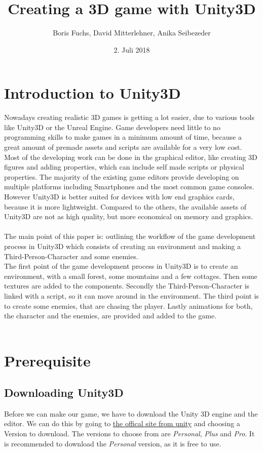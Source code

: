 \documentclass[12pt, a4paper, titlepage]{article}
\title{Creating a 3D game with Unity3D}
\date{2. Juli 2018}
\author{Boris Fuchs, David Mitterlehner, Anika Seibezeder}
\begin{document}
\maketitle
\tableofcontents 

\section{Introduction to Unity3D}
Nowadays creating realistic 3D games is getting a lot easier, due to various tools like Unity3D or the Unreal Engine. Game developers need little to no programming skills to make games in a minimum amount of time, because a great amount of premade assets and scripts are available for a very low cost. Most of the developing work can be done in the graphical editor, like creating 3D figures and adding properties, which can include self made scripts or physical properties. The majority of the existing game editors provide developing on multiple platforms including Smartphones and the most common game consoles. However Unity3D is better suited for devices with low end graphics cards, because it is more lightweight. Compared to the others, the available assets of Unity3D are not as high quality, but more economical on memory and graphics. \\ \\
The main point of this paper is: outlining the workflow of the game development process in Unity3D which consists of creating an environment and making a Third-Person-Character and some enemies.  \\
The first point of the game development process in Unity3D is to create an environment, with a small forest, some mountains and a few cottages. Then some textures are added to the components.
Secondly the Third-Person-Character is linked with a  script, so it can move around in the environment.
The third point is to create some enemies, that are chasing the player. 
Lastly animations for both, the character and the enemies, are provided and added to the game. \\ \\

\section{Prerequisite}
\subsection{Downloading Unity3D}
Before we can make our game, we have to download the Unity 3D engine and the editor. We can do this by going to \href{https://unity3d.com/unity}{the offical site from unity} and choosing a Version to download. The versions to choose from are \emph{Personal}, \emph{Plus} and \emph{Pro}. It is recommended to download the \emph{Personal} version, as it is free to use.
\end{document}
